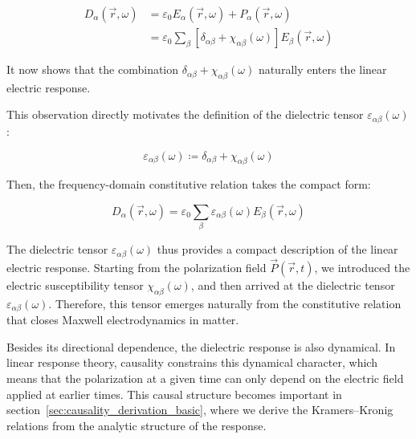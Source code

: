 \begin{equation}
\begin{aligned}
    D_\alpha(\vec{r},\omega)
    &=\varepsilon_0 E_\alpha(\vec{r},\omega)+P_\alpha(\vec{r},\omega) \\
    &=\varepsilon_0\sum_\beta\left[\delta_{\alpha\beta}+\chi_{\alpha\beta}(\omega)\right]E_\beta(\vec{r},\omega)
\end{aligned}
\label{electric_displacement_from_susceptibility}
\end{equation}

It now shows that the combination $\delta_{\alpha\beta}+\chi_{\alpha\beta}(\omega)$ naturally enters the linear electric response.

This observation directly motivates the definition of the dielectric tensor $\varepsilon_{\alpha\beta}(\omega)$:

\begin{equation}
    \varepsilon_{\alpha\beta}(\omega)
    \coloneqq\delta_{\alpha\beta}+\chi_{\alpha\beta}(\omega)
\label{dielectric_tensor_definition}
\end{equation}

Then, the frequency-domain constitutive relation takes the compact form:

\begin{equation}
    D_\alpha(\vec{r},\omega)
    = \varepsilon_0\sum_\beta\varepsilon_{\alpha\beta}(\omega)E_\beta(\vec{r},\omega)
\label{frequency_domain_constitutive_relation_with_dielectric_tensor}
\end{equation}

The dielectric tensor $\varepsilon_{\alpha\beta}(\omega)$ thus provides a compact description of the linear electric response.
Starting from the polarization field $\vec{P}(\vec{r},t)$,
we introduced the electric susceptibility tensor $\chi_{\alpha\beta}(\omega)$,
and then arrived at the dielectric tensor $\varepsilon_{\alpha\beta}(\omega)$.
Therefore, this tensor emerges naturally from the constitutive relation that closes Maxwell electrodynamics in matter.

Besides its directional dependence, the dielectric response is also dynamical.
In linear response theory, causality constrains this dynamical character,
which means that the polarization at a given time can only depend on the electric field applied at earlier times.
This causal structure becomes important in section~\ref{sec:causality_derivation_basic},
where we derive the Kramers--Kronig relations from the analytic structure of the response.

